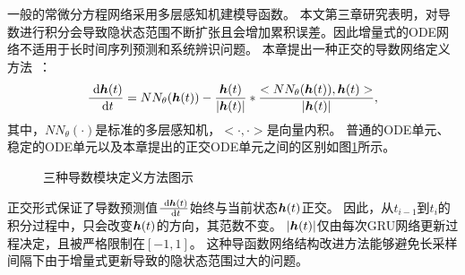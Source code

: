 一般的常微分方程网络采用多层感知机建模导函数。
本文第三章研究表明，对导数进行积分会导致隐状态范围不断扩张且会增加累积误差。因此增量式的ODE网络不适用于长时间序列预测和系统辨识问题。
本章提出一种正交的导数网络定义方法~\cite{jia2019neural}：
\begin{equation}
\frac{\mathrm{~d} \boldsymbol h(t)}{\mathrm{~d}t}=NN_{\theta}(\boldsymbol h(t))-\frac{\boldsymbol h(t)}{|\boldsymbol h(t)|}*\frac{<{NN_{\theta}(\boldsymbol h(t))},{\boldsymbol h(t)}>}{|\boldsymbol h(t)|},
\end{equation}
其中，$NN_{\theta}(\cdot)$是标准的多层感知机，$<\cdot, \cdot>$是向量内积。 
普通的ODE单元、稳定的ODE单元以及本章提出的正交ODE单元之间的区别如图\ref{fig:cells}所示。
\begin{figure}[h]
    \centering
    \caption{三种导数模块定义方法图示}
    \label{fig:cells}
\end{figure}
正交形式保证了导数预测值$\frac{\mathrm{~d} \boldsymbol h(t)}{\mathrm{~d}t}$始终与当前状态$\boldsymbol h(t)$正交。
因此，从$t_{i-1}$到$t_{i}$的积分过程中，只会改变$\boldsymbol h(t)$的方向，其范数不变。
$|\boldsymbol h(t)|$仅由每次GRU网络更新过程决定，且被严格限制在$[-1,1]$。
这种导函数网络结构改进方法能够避免长采样间隔下由于增量式更新导致的隐状态范围过大的问题。

